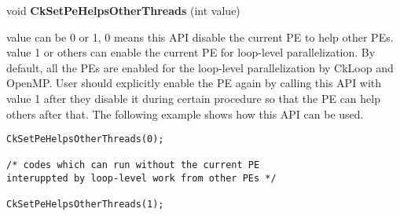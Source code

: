 void \textbf{CkSetPeHelpsOtherThreads} (int value)


value can be 0 or 1, 0 means this API disable the current PE to help other PEs. value 1 or others can enable the current PE for loop-level parallelization.
By default, all the PEs are enabled for the loop-level parallelization by CkLoop and OpenMP.
User should explicitly enable the PE again by calling this API with value 1 after they disable it during certain procedure so that the PE can help others after that. The following example shows how this API can be used.

\begin{verbatim}
CkSetPeHelpsOtherThreads(0);

/* codes which can run without the current PE
interuppted by loop-level work from other PEs */

CkSetPeHelpsOtherThreads(1);
\end{verbatim}
